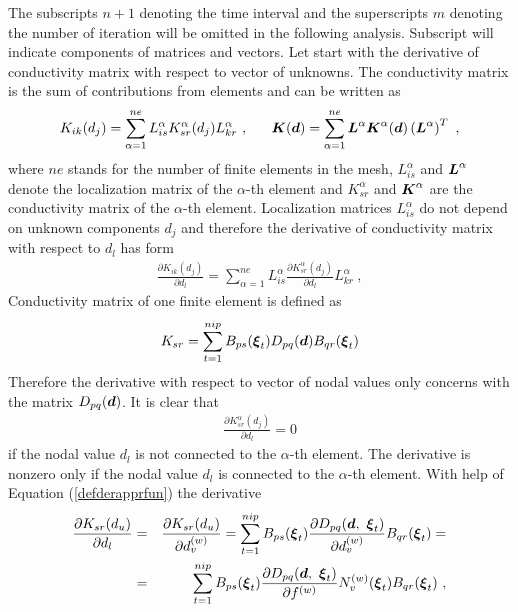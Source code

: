 \documentclass[12pt]{book}
\newcommand{\mbf}[1]{\mbox{\boldmath$#1$}}
\newcommand{\del}[2]{\mbox{$\displaystyle\frac{#1}{#2}$}}
\newcommand{\ppd}[2]{\del{\partial{#1}}{\partial{#2}}}
\begin{document}
The subscripts $n+1$ denoting the time interval and the superscripts $m$ denoting the number of iteration
will be omitted in the following analysis. Subscript will indicate components of matrices and vectors.
Let start with the derivative of conductivity matrix with respect to vector of unknowns. The conductivity matrix
is the sum of contributions from elements and can be written as
\begin{equation}
K_{ik}(d_{j}) = \sum_{\alpha=1}^{ne} L_{is}^{\alpha} K_{sr}^{\alpha}(d_{j}) L_{kr}^{\alpha}\ ,\ \ \ \ \
\mbf{K}(\mbf{d}) = \sum_{\alpha=1}^{ne} \mbf{L}^{\alpha} \mbf{K}^{\alpha}(\mbf{d}) \left(\mbf{L}^{\alpha}\right)^T\ ,
\end{equation}
where $ne$ stands for the number of finite elements in the mesh, $L_{is}^{\alpha}$ and $\mbf{L}^{\alpha}$ denote the
localization matrix of the $\alpha$-th element and $K_{sr}^{\alpha}$ and $\mbf{K}^{\alpha}$ are the conductivity
matrix of the $\alpha$-th element.
Localization matrices $L_{is}^{\alpha}$ do not depend on unknown
components $d_{j}$ and therefore the derivative of conductivity matrix with respect to $d_{l}$ has form
\begin{eqnarray}
\ppd{K_{ik}(d_{j})}{d_{l}} = \sum_{\alpha=1}^{ne} L_{is}^{\alpha} \ppd{K_{sr}^{\alpha}(d_{j})}{d_{l}} L_{kr}^{\alpha}\ ,
\end{eqnarray}
Conductivity matrix of one finite element is defined as
\begin{equation}
K_{sr} = \sum_{t=1}^{nip} B_{ps}(\mbf{\xi}_{t}) D_{pq}(\mbf{d}) B_{qr}(\mbf{\xi}_{t})
\end{equation}
Therefore the derivative with respect to vector of nodal values only concerns with the matrix $D_{pq}(\mbf{d})$.
It is clear that
\begin{eqnarray}
\ppd{K_{sr}^{\alpha}(d_{j})}{d_{l}} = 0
\end{eqnarray}
if the nodal value $d_{l}$ is not connected to the $\alpha$-th element. The derivative is nonzero only if
the nodal value $d_{l}$ is connected to the $\alpha$-th element. With help of Equation (\ref{defderapprfun})
the derivative
\begin{eqnarray}\label{dercondmatelem}
\ppd{K_{sr}(d_u)}{d_l} &=& \ppd{K_{sr}(d_u)}{d_v^{(w)}} =
\sum_{t=1}^{nip} B_{ps}(\mbf{\xi}_{t}) \ppd{D_{pq}(\mbf{d},\ \mbf{\xi}_{t})}{d_v^{(w)}} B_{qr}(\mbf{\xi}_{t}) =
\\ \nonumber &=&
\sum_{t=1}^{nip} B_{ps}(\mbf{\xi}_{t}) \ppd{D_{pq}(\mbf{d},\ \mbf{\xi}_{t})}{f^{(w)}} N^{(w)}_{v}(\mbf{\xi}_{t}) B_{qr}(\mbf{\xi}_{t})\ ,
\end{eqnarray}
\end{document}
